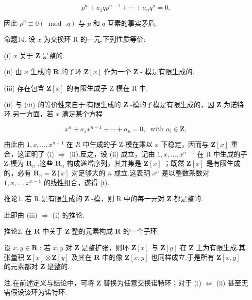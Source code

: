 \documentclass[10pt]{article}
\begin{document}
\[
{p}^{n} + {a}_{1}q{p}^{n - 1} + \cdots  + {a}_{n}{q}^{n} = 0,
\]

因此 \({p}^{n} \equiv  0\left( {{\;\operatorname{mod}\;.}q}\right)\) 与 \(p\) 和 \(q\) 互素的事实矛盾.

命题14. 设 \(x\) 为交换环 R 的一元.下列性质等价:

(i) \(x\) 关于 \(\mathbf{Z}\) 是整的.

(ii) 由 \(x\) 生成的 \(\mathbf{R}\) 的子环 \(\mathbf{Z}\left\lbrack  x\right\rbrack\) 作为一个 \(\mathbf{Z}\) - 模是有限生成的.

(iii) 存在包含 \(\mathbf{Z}\left\lbrack  x\right\rbrack\) 的有限生成子 Z-模在 \(\mathrm{R}\) 中.

(ii) 与 (iii) 的等价性来自于:有限生成的 \(\mathbf{Z}\) -模的子模是有限生成的，因 \(\mathbf{Z}\) 为诺特环.另一方面，若 \(x\) 满足某个方程

\[
{x}^{n} + {a}_{1}{x}^{n - 1} + \cdots  + {a}_{n} = 0,\;\text{ with }{a}_{i} \in  \mathbf{Z},
\]

由此由 \(1,x,\ldots ,{x}^{n - 1}\) 在 \(R\) 中生成的子 Z-模在乘以 \(x\) 下稳定，因而与 \(\mathbf{Z}\left\lbrack  x\right\rbrack\) 重合，这证明了 (i) \(\Rightarrow\) (ii).反之，设 (ii) 成立，记由 \(1,x,\ldots ,{x}^{n - 1}\) 在 R 中生成的子 Z-模为 \({\mathbf{R}}_{n}\) .这些 \({\mathbf{R}}_{n}\) 构成递增序列，其并集是 \(\mathbf{Z}\left\lbrack  x\right\rbrack\) ；既然 \(\mathbf{Z}\left\lbrack  x\right\rbrack\) 是有限生成的，必有 \({\mathbf{R}}_{n} = \mathbf{Z}\left\lbrack  x\right\rbrack\) 对足够大的 \(n\) 成立.这表明 \({x}^{n}\) 是以整数系数对 \(1,x,\ldots ,{x}^{n - 1}\) 的线性组合，遂得 (i).

推论1. 若 \(\mathrm{R}\) 是有限生成的 \(\mathbf{Z}\) -模，则 \(\mathrm{R}\) 中的每一元对 \(\mathbf{Z}\) 都是整的.

此即由 (iii) \(\Rightarrow\) (i) 的推论.

推论2. 在 \(\mathbf{R}\) 中关于 \(\mathbf{Z}\) 整的元素构成 \(\mathbf{R}\) 的一个子环.

设 \(x,y \in  \mathbf{R}\) ; 若 \(x,y\) 对 \(\mathbf{Z}\) 是整扩张，则环 \(\mathbf{Z}\left\lbrack  x\right\rbrack\) 与 \(\mathbf{Z}\left\lbrack  y\right\rbrack\) 在 \(\mathbf{Z}\) 上为有限生成.其张量积 \(\mathbf{Z}\left\lbrack  x\right\rbrack   \otimes  \mathbf{Z}\left\lbrack  y\right\rbrack\) 及其在 \(\mathbf{R}\) 中的像 \(\mathbf{Z}\left\lbrack  {x,y}\right\rbrack\) 也同样成立.于是所有 \(\mathbf{Z}\left\lbrack  {x,y}\right\rbrack\) 的元素都对 \(\mathbf{Z}\) 是整的.

注.在前述定义与结论中，可将 \(\mathbf{Z}\) 替换为任意交换诺特环；对于 (i) \(\Leftrightarrow\) (ii) 甚至无需假设该环为诺特环.
\end{document}
